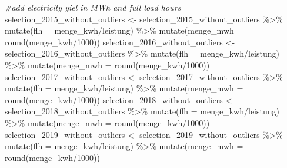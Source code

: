 \documentclass[a4paper,11pt]{article}
\newenvironment{Shaded}{\begin{snugshade}}{\end{snugshade}}
\newcommand{\AttributeTok}[1]{\textcolor[rgb]{0.77,0.63,0.00}{#1}}
\newcommand{\CommentTok}[1]{\textcolor[rgb]{0.56,0.35,0.01}{\textit{#1}}}
\newcommand{\DecValTok}[1]{\textcolor[rgb]{0.00,0.00,0.81}{#1}}
\newcommand{\FunctionTok}[1]{\textcolor[rgb]{0.00,0.00,0.00}{#1}}
\newcommand{\NormalTok}[1]{#1}
\newcommand{\OtherTok}[1]{\textcolor[rgb]{0.56,0.35,0.01}{#1}}
\newcommand{\SpecialCharTok}[1]{\textcolor[rgb]{0.00,0.00,0.00}{#1}}
\begin{document}
\begin{Shaded}
\begin{Highlighting}[]
\CommentTok{\#add electricity yiel in MWh and full load hours}
\NormalTok{selection\_2015\_without\_outliers }\OtherTok{\textless{}{-}}\NormalTok{ selection\_2015\_without\_outliers }\SpecialCharTok{\%\textgreater{}\%} 
  \FunctionTok{mutate}\NormalTok{(}\AttributeTok{flh =}\NormalTok{ menge\_kwh}\SpecialCharTok{/}\NormalTok{leistung) }\SpecialCharTok{\%\textgreater{}\%}
  \FunctionTok{mutate}\NormalTok{(}\AttributeTok{menge\_mwh =} \FunctionTok{round}\NormalTok{(menge\_kwh}\SpecialCharTok{/}\DecValTok{1000}\NormalTok{))}
\NormalTok{selection\_2016\_without\_outliers }\OtherTok{\textless{}{-}}\NormalTok{ selection\_2016\_without\_outliers }\SpecialCharTok{\%\textgreater{}\%} 
  \FunctionTok{mutate}\NormalTok{(}\AttributeTok{flh =}\NormalTok{ menge\_kwh}\SpecialCharTok{/}\NormalTok{leistung) }\SpecialCharTok{\%\textgreater{}\%}
  \FunctionTok{mutate}\NormalTok{(}\AttributeTok{menge\_mwh =} \FunctionTok{round}\NormalTok{(menge\_kwh}\SpecialCharTok{/}\DecValTok{1000}\NormalTok{))}
\NormalTok{selection\_2017\_without\_outliers }\OtherTok{\textless{}{-}}\NormalTok{ selection\_2017\_without\_outliers }\SpecialCharTok{\%\textgreater{}\%} 
  \FunctionTok{mutate}\NormalTok{(}\AttributeTok{flh =}\NormalTok{ menge\_kwh}\SpecialCharTok{/}\NormalTok{leistung) }\SpecialCharTok{\%\textgreater{}\%}
  \FunctionTok{mutate}\NormalTok{(}\AttributeTok{menge\_mwh =} \FunctionTok{round}\NormalTok{(menge\_kwh}\SpecialCharTok{/}\DecValTok{1000}\NormalTok{))}
\NormalTok{selection\_2018\_without\_outliers }\OtherTok{\textless{}{-}}\NormalTok{ selection\_2018\_without\_outliers }\SpecialCharTok{\%\textgreater{}\%} 
  \FunctionTok{mutate}\NormalTok{(}\AttributeTok{flh =}\NormalTok{ menge\_kwh}\SpecialCharTok{/}\NormalTok{leistung) }\SpecialCharTok{\%\textgreater{}\%}
  \FunctionTok{mutate}\NormalTok{(}\AttributeTok{menge\_mwh =} \FunctionTok{round}\NormalTok{(menge\_kwh}\SpecialCharTok{/}\DecValTok{1000}\NormalTok{))}
\NormalTok{selection\_2019\_without\_outliers }\OtherTok{\textless{}{-}}\NormalTok{ selection\_2019\_without\_outliers }\SpecialCharTok{\%\textgreater{}\%} 
  \FunctionTok{mutate}\NormalTok{(}\AttributeTok{flh =}\NormalTok{ menge\_kwh}\SpecialCharTok{/}\NormalTok{leistung) }\SpecialCharTok{\%\textgreater{}\%}
  \FunctionTok{mutate}\NormalTok{(}\AttributeTok{menge\_mwh =} \FunctionTok{round}\NormalTok{(menge\_kwh}\SpecialCharTok{/}\DecValTok{1000}\NormalTok{))}


\end{Highlighting}
\end{Shaded}
\end{document}
